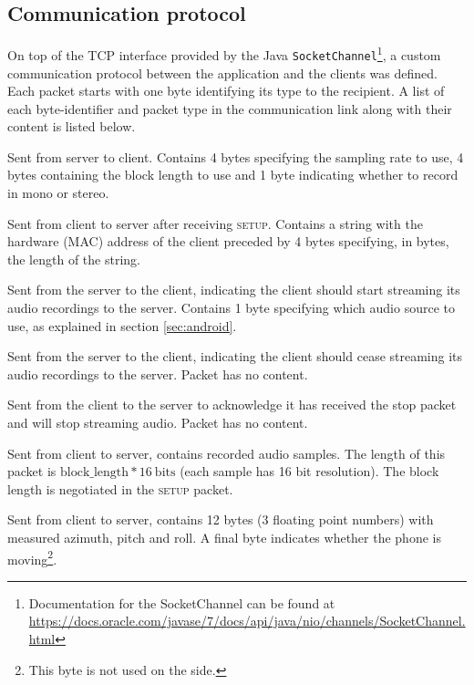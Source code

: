 \documentclass[a4paper, notitlepage]{report}
\begin{document}
\subsection{Communication protocol}
\label{subsec:communication-protocol}
On top of the TCP interface provided by the Java \texttt{SocketChannel}\footnote{Documentation for the SocketChannel can be found at \url{https://docs.oracle.com/javase/7/docs/api/java/nio/channels/SocketChannel.html}}, a custom communication protocol between the \matlab application and the clients was defined. Each packet starts with one byte identifying its type to the recipient. A list of each byte-identifier and packet type in the communication link along with their content is listed below.
\begin{StateDescription}
\item[1: setup] Sent from server to client. Contains 4 bytes specifying the sampling rate to use, 4 bytes containing the block length to use and 1 byte indicating whether to record in mono or stereo.

\item[2: ack\_setup] Sent from client to server after receiving \textsc{setup}. Contains a string with the hardware (MAC) address of the client preceded by 4 bytes specifying, in bytes, the length of the string.

\item[3: start\_streaming] Sent from the server to the client, indicating the client should start streaming its audio recordings to the server. Contains 1 byte specifying which audio source to use, as explained in section \ref{sec:android}.

\item[4: stop\_streaming] Sent from the server to the client, indicating the client should cease streaming its audio recordings to the server. Packet has no content.

\item[5: ack\_stop] Sent from the client to the server to acknowledge it has received the stop packet and will stop streaming audio. Packet has no content.

\item[6: stream\_data] Sent from client to server, contains recorded audio samples. The length of this packet is $\text{block\_length}*16~ \text{bits}$ (each sample has 16 bit resolution). The block length is negotiated in the \textsc{setup} packet.

\item[7: orientation\_update] Sent from client to server, contains 12 bytes (3 floating point numbers) with measured azimuth, pitch and roll. A final byte indicates whether the phone is moving\footnote{This byte is not used on the \matlab side.}. 
\end{StateDescription}
\end{document}
